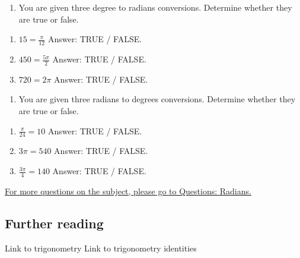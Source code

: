 \documentclass[
  12pt,
  a4paper, oneside]{starmastarticle}
\providecommand{\tightlist}{%
  \setlength{\itemsep}{0pt}\setlength{\parskip}{0pt}}\usepackage{longtable,booktabs,array}
\begin{document}
\begin{enumerate}
\def\labelenumi{\arabic{enumi}.}
\tightlist
\item
  You are given three degree to radians conversions. Determine whether
  they are true or false.
\end{enumerate}

\begin{enumerate}
\def\labelenumi{(\alph{enumi})}
\item
  \(15 = \frac{\pi}{12}\) Answer: TRUE / FALSE.
\item
  \(450 = \frac{5\pi}{2}\) Answer: TRUE / FALSE.
\item
  \(720 = 2\pi\) Answer: TRUE / FALSE.
\end{enumerate}

\begin{enumerate}
\def\labelenumi{\arabic{enumi}.}
\setcounter{enumi}{1}
\tightlist
\item
  You are given three radians to degrees conversions. Determine whether
  they are true or false.
\end{enumerate}

\begin{enumerate}
\def\labelenumi{(\alph{enumi})}
\item
  \(\frac{\pi}{24} = 10\) Answer: TRUE / FALSE.
\item
  \(3\pi = 540\) Answer: TRUE / FALSE.
\item
  \(\frac{3\pi}{4} = 140\) Answer: TRUE / FALSE.
\end{enumerate}

\href{qs-radians.qmd}{For more questions on the subject, please go to
Questions: Radians.}

\hypertarget{further-reading}{%
\subsection*{Further reading}\label{further-reading}}

Link to trigonometry Link to trigonometry identities
\end{document}
